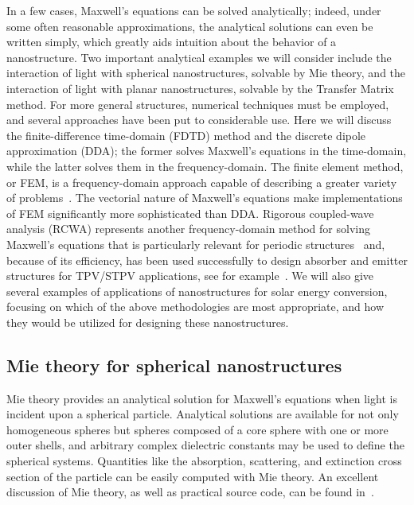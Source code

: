 \documentclass[review]{elsarticle}
\begin{document}
In a few cases, Maxwell's equations  can be solved analytically; indeed, under some often
reasonable approximations, the analytical solutions can even be written simply, which
greatly aids intuition about the behavior of a nanostructure.  Two important analytical examples we will
consider include the interaction of light with spherical nanostructures, solvable by Mie
theory, and the interaction of light with planar nanostructures, solvable by the Transfer
Matrix method.   For more general structures, numerical techniques must be employed, and
several approaches have been put to considerable use.  Here we will
discuss the finite-difference time-domain (FDTD) method and the discrete dipole
approximation (DDA); the former solves Maxwell's equations in the time-domain, while the 
latter
solves them in the frequency-domain.  The finite element method, or FEM, is a  
frequency-domain approach capable of describing a greater variety of problems~\cite{fem}.
The vectorial
nature of Maxwell's equations make
implementations of FEM significantly more sophisticated than DDA.  Rigorous coupled-wave analysis (RCWA) represents
another frequency-domain method for solving Maxwell's equations that is particularly relevant for periodic structures~\cite{RCWA1,RCWA2} and, because of its efficiency, has been used successfully to design
absorber and emitter structures for TPV/STPV applications, see for example~\cite{A13, RCWA3}.  We will also give several
examples of applications of nanostructures for
solar energy conversion, focusing on which of the above methodologies are most
appropriate, and how they would be utilized for designing these nanostructures.

\subsection{Mie theory for spherical nanostructures}
Mie theory provides an analytical solution for Maxwell's equations when light is incident
upon a spherical particle. Analytical solutions are available for not only
homogeneous spheres but spheres composed of a core sphere with one or more outer shells, and
arbitrary complex dielectric constants may be used to define the spherical systems.   
Quantities like the absorption, scattering, and extinction cross section of the particle
can be easily computed with Mie theory. 
An excellent
discussion of Mie theory, as well as practical source code, can be found in~\cite{Bohren}.
\end{document}
